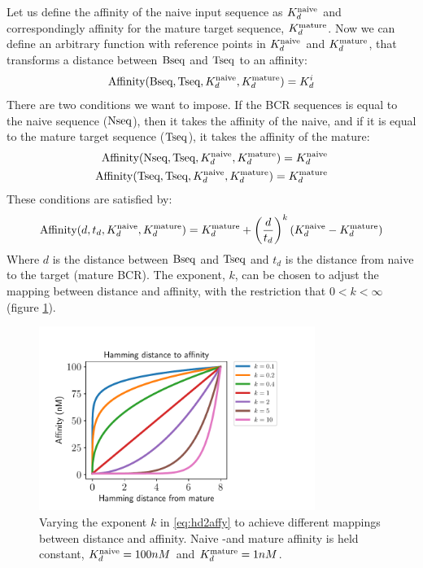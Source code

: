 Let us define the affinity of the naive input sequence as $K^{\text{naive}}_d$ and correspondingly affinity for the mature target sequence, $K^{\text{mature}}_d$.
Now we can define an arbitrary function with reference points in $K^{\text{naive}}_d$ and $K^{\text{mature}}_d$, that transforms a distance between $\text{Bseq}$ and $\text{Tseq}$ to an affinity:
$$
\text{Affinity}(\text{Bseq}, \text{Tseq}, K^{\text{naive}}_d, K^{\text{mature}}_d) = K^i_d
$$
There are two conditions we want to impose.
If the BCR sequences is equal to the naive sequence ($\text{Nseq}$), then it takes the affinity of the naive, and if it is equal to the mature target sequence ($\text{Tseq}$), it takes the affinity of the mature:
\begin{equation}
\begin{split}
\text{Affinity}(\text{Nseq}, \text{Tseq}, K^{\text{naive}}_d, K^{\text{mature}}_d) = K^{\text{naive}}_d \\
\text{Affinity}(\text{Tseq}, \text{Tseq}, K^{\text{naive}}_d, K^{\text{mature}}_d) = K^{\text{mature}}_d
\end{split}
\label{eq:hd2affy_cond}
\end{equation}
These conditions are satisfied by:
\begin{equation}
\text{Affinity}(d, t_d, K^{\text{naive}}_d, K^{\text{mature}}_d) = K^{\text{mature}}_d + \left ( \frac{d}{t_d} \right )^k (K^{\text{naive}}_d - K^{\text{mature}}_d)
\label{eq:hd2affy}
\end{equation}
Where $d$ is the distance between $\text{Bseq}$ and $\text{Tseq}$ and $t_d$ is the distance from naive to the target (mature BCR).
The exponent, $k$, can be chosen to adjust the mapping between distance and affinity, with the restriction that $0 < k < \infty$ (figure \ref{fig:hd2affy}).
\begin{figure}
    \centering
    \includegraphics[width=0.8\textwidth]{figures/hd2affy.pdf}
    \caption{
        \label{fig:hd2affy}
        Varying the exponent $k$ in \eqref{eq:hd2affy} to achieve different mappings between distance and affinity. Naive -and mature affinity is held constant, $K^{\text{naive}}_d = 100nM$ and $K^{\text{mature}}_d = 1nM$.
    }
\end{figure}

